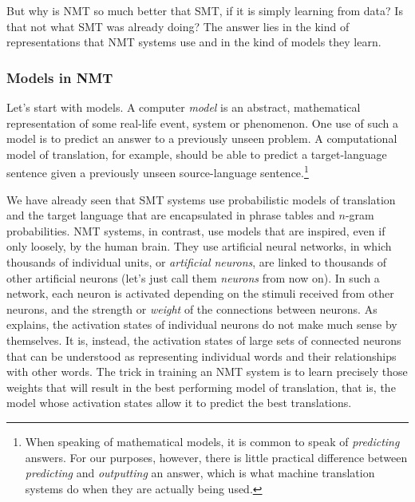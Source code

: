 \documentclass[output=paper]{langscibook}
\begin{document}
But why is NMT so much better that SMT, if it is simply learning from data? Is that not what SMT was already doing? The answer lies in the kind of representations that NMT systems use and in the kind of models they learn.

\subsubsection{Models in NMT}
Let's start with models. A computer \textit{model} is an abstract, mathematical representation of some real-life event, system or phenomenon. One use of such a model is to predict an answer to a previously unseen problem. A computational model of translation, for example, should be able to predict a target-language sentence given a previously unseen source-language sentence.\footnote{When speaking of mathematical models, it is common to speak of \textit{predicting} answers. For our purposes, however, there is little practical difference between \textit{predicting} and \textit{outputting} an answer, which is what machine translation systems do when they are actually being used.} 

We have already seen that SMT systems use probabilistic models of translation and the target language that are encapsulated in phrase tables and $n$-gram probabilities. NMT systems, in contrast, use models that are inspired, even if only loosely, by the human brain. They use artificial neural networks, in which thousands of individual units, or \textit{artificial neurons}, are linked to thousands of other artificial neurons (let's just call them \textit{neurons} from now on). In such a network, each neuron is activated depending on the stimuli received from other neurons, and the strength or \textit{weight} of the connections between neurons. As \citet{Forcada2017} explains, the activation states of individual neurons do not make much sense by themselves. It is, instead, the activation states of large sets of connected neurons that can be understood as representing individual words and their relationships with other words. The trick in training an NMT system is to learn precisely those weights that will result in the best performing model of translation, that is, the model whose activation states allow it to predict the best translations.
\end{document}
